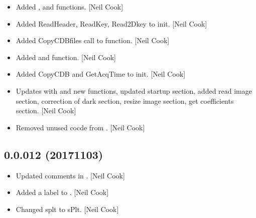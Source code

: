 \documentclass[a4paper,10pt,english]{report}
\begin{document}
\begin{itemize}
\item {} 
Added ,  and  functions. {[}Neil
Cook{]}

\item {} 
Added ReadHeader, ReadKey, Read2Dkey to init. {[}Neil Cook{]}

\item {} 
Added CopyCDBfiles call to  function. {[}Neil Cook{]}

\item {} 
Added  and  function. {[}Neil Cook{]}

\item {} 
Added CopyCDB and GetAcqTime to init. {[}Neil Cook{]}

\item {} 
Updates  with  and new functions, updated startup
section, added read image section, correction of dark section, resize
image section, get coefficients section. {[}Neil Cook{]}

\item {} 
Removed unused cocde from . {[}Neil Cook{]}

\end{itemize}


\subsection{0.0.012 (2017\sphinxhyphen{}11\sphinxhyphen{}03)}
\label{\detokenize{misc/changelog:id558}}\begin{itemize}
\item {} 
Updated comments in . {[}Neil Cook{]}

\item {} 
Added a label to . {[}Neil Cook{]}

\item {} 
Changed splt to sPlt. {[}Neil Cook{]}

\end{itemize}
\end{document}
